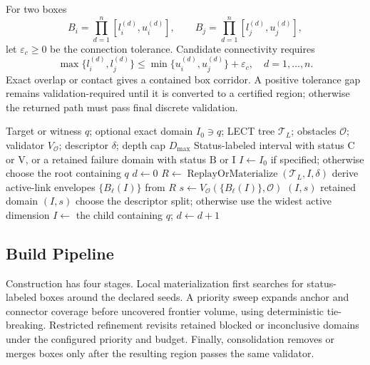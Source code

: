 \documentclass[journal]{IEEEtran}
\newcommand{\calO}{\ensuremath{\mathcal{O}}}
\newcommand{\StatusC}{\ensuremath{\mathrm{C}}}
\newcommand{\StatusV}{\ensuremath{\mathrm{V}}}
\newcommand{\StatusB}{\ensuremath{\mathrm{B}}}
\newcommand{\StatusI}{\ensuremath{\mathrm{I}}}
\begin{document}
For two boxes
\[
B_i=\prod_{d=1}^{n}[l_i^{(d)},u_i^{(d)}],\qquad
B_j=\prod_{d=1}^{n}[l_j^{(d)},u_j^{(d)}],
\]
let $\varepsilon_c\ge0$ be the connection tolerance. Candidate connectivity
requires
\[
\max\{l_i^{(d)},l_j^{(d)}\}
\le
\min\{u_i^{(d)},u_j^{(d)}\}+\varepsilon_c,
\quad d=1,\ldots,n.
\]
Exact overlap or contact gives a contained box corridor. A positive tolerance
gap remains validation-required until it is converted to a certified region;
otherwise the returned path must pass final discrete validation.

\begin{algorithm}[t]
\caption{Local box materialization around a seed or retained domain.}
\label{alg:ffb_rewrite}
\footnotesize
\begin{algorithmic}[1]
\REQUIRE Target or witness $q$; optional exact domain $I_0\ni q$; LECT tree
$\mathcal{T}_L$; obstacles $\calO$; validator $V_{\calO}$; descriptor
$\delta$; depth cap $D_{\max}$
\ENSURE Status-labeled interval with status $\StatusC$ or $\StatusV$, or a
retained failure domain with status $\StatusB$ or $\StatusI$
\STATE $I\leftarrow I_0$ if specified; otherwise choose the root containing $q$
\STATE $d\leftarrow0$
  \STATE $R\leftarrow\operatorname{ReplayOrMaterialize}(\mathcal{T}_L,I,\delta)$
  \STATE derive active-link envelopes $\{B_\ell(I)\}$ from $R$
  \STATE $s\leftarrow V_{\calO}(\{B_\ell(I)\},\calO)$
  \IF{$s\in\{\StatusC,\StatusV\}$}
    \RETURN $(I,s)$
  \ENDIF
    \RETURN retained domain $(I,s)$
  \ENDIF
  \STATE choose the descriptor split; otherwise use the widest active dimension
  \STATE $I\leftarrow$ the child containing $q$; $d\leftarrow d+1$
\ENDWHILE
\end{algorithmic}
\end{algorithm}

\subsection{Build Pipeline}

Construction has four stages. Local materialization first searches for
status-labeled boxes around the declared seeds. A priority sweep expands anchor
and connector coverage before uncovered frontier volume, using deterministic
tie-breaking. Restricted refinement revisits retained blocked or inconclusive
domains under the configured priority and budget. Finally, consolidation removes
or merges boxes only after the resulting region passes the same validator.
\end{document}
